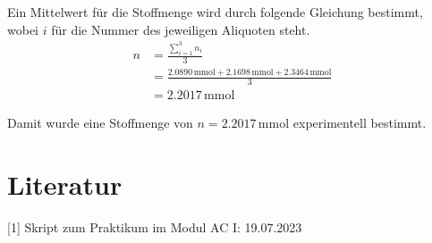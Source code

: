 \documentclass[12pt]{scrartcl} %
\begin{document}
Ein Mittelwert für die Stoffmenge wird durch folgende Gleichung bestimmt, wobei $i$ für die Nummer des jeweiligen Aliquoten steht.
\begin{align*}
    n &= \frac{\sum_{i=1}^{3} n_i}{3}\\
    &= \frac{2.0890\,\mathrm{mmol} + 2.1698\,\mathrm{mmol} + 2.3464\,\mathrm{mmol}}{3}\\
    &= 2.2017\,\mathrm{mmol}
\end{align*}

Damit wurde eine Stoffmenge von $n = 2.2017\,\mathrm{mmol}$ experimentell bestimmt.

\section{Literatur}
[1] Skript zum Praktikum im Modul AC I: 19.07.2023
\end{document}

